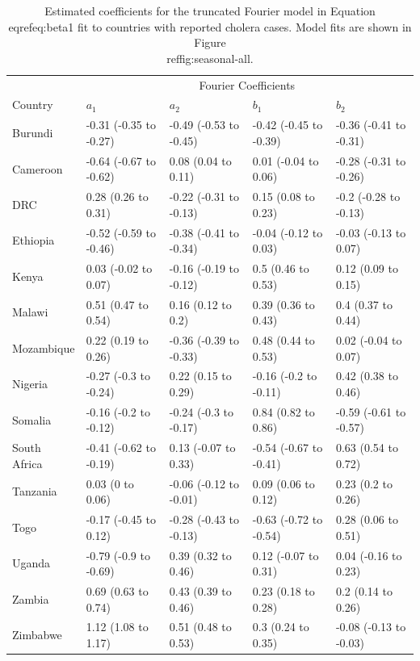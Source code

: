\documentclass[
]{book}
\begin{document}
\begin{table}[!h]
\centering
\caption{\label{tab:seasonal-table}Estimated coefficients for the truncated Fourier model in Equation \\eqref{eq:beta1} fit to countries with reported cholera cases. Model fits are shown in Figure \\ref{fig:seasonal-all}.}
\centering
\fontsize{11.75}{13.75}\selectfont
\begin{tabular}[t]{l|l|l|l|l}
\hline
\multicolumn{1}{c|}{ } & \multicolumn{4}{c}{Fourier Coefficients} \\
\cline{2-5}
Country & $a_1$ & $a_2$ & $b_1$ & $b_2$\\
\hline
Burundi & -0.31 (-0.35 to -0.27) & -0.49 (-0.53 to -0.45) & -0.42 (-0.45 to -0.39) & -0.36 (-0.41 to -0.31)\\
\hline
Cameroon & -0.64 (-0.67 to -0.62) & 0.08 (0.04 to 0.11) & 0.01 (-0.04 to 0.06) & -0.28 (-0.31 to -0.26)\\
\hline
DRC & 0.28 (0.26 to 0.31) & -0.22 (-0.31 to -0.13) & 0.15 (0.08 to 0.23) & -0.2 (-0.28 to -0.13)\\
\hline
Ethiopia & -0.52 (-0.59 to -0.46) & -0.38 (-0.41 to -0.34) & -0.04 (-0.12 to 0.03) & -0.03 (-0.13 to 0.07)\\
\hline
Kenya & 0.03 (-0.02 to 0.07) & -0.16 (-0.19 to -0.12) & 0.5 (0.46 to 0.53) & 0.12 (0.09 to 0.15)\\
\hline
Malawi & 0.51 (0.47 to 0.54) & 0.16 (0.12 to 0.2) & 0.39 (0.36 to 0.43) & 0.4 (0.37 to 0.44)\\
\hline
Mozambique & 0.22 (0.19 to 0.26) & -0.36 (-0.39 to -0.33) & 0.48 (0.44 to 0.53) & 0.02 (-0.04 to 0.07)\\
\hline
Nigeria & -0.27 (-0.3 to -0.24) & 0.22 (0.15 to 0.29) & -0.16 (-0.2 to -0.11) & 0.42 (0.38 to 0.46)\\
\hline
Somalia & -0.16 (-0.2 to -0.12) & -0.24 (-0.3 to -0.17) & 0.84 (0.82 to 0.86) & -0.59 (-0.61 to -0.57)\\
\hline
South Africa & -0.41 (-0.62 to -0.19) & 0.13 (-0.07 to 0.33) & -0.54 (-0.67 to -0.41) & 0.63 (0.54 to 0.72)\\
\hline
Tanzania & 0.03 (0 to 0.06) & -0.06 (-0.12 to -0.01) & 0.09 (0.06 to 0.12) & 0.23 (0.2 to 0.26)\\
\hline
Togo & -0.17 (-0.45 to 0.12) & -0.28 (-0.43 to -0.13) & -0.63 (-0.72 to -0.54) & 0.28 (0.06 to 0.51)\\
\hline
Uganda & -0.79 (-0.9 to -0.69) & 0.39 (0.32 to 0.46) & 0.12 (-0.07 to 0.31) & 0.04 (-0.16 to 0.23)\\
\hline
Zambia & 0.69 (0.63 to 0.74) & 0.43 (0.39 to 0.46) & 0.23 (0.18 to 0.28) & 0.2 (0.14 to 0.26)\\
\hline
Zimbabwe & 1.12 (1.08 to 1.17) & 0.51 (0.48 to 0.53) & 0.3 (0.24 to 0.35) & -0.08 (-0.13 to -0.03)\\
\hline
\end{tabular}
\end{table}
\end{document}
